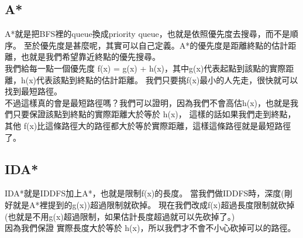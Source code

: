 \documentclass{article}
\begin{document}
\subsection{A*}
A*就是把BFS裡的queue換成priority queue，也就是依照優先度去搜尋，而不是順序。
至於優先度是甚麼呢，其實可以自己定義。A*的優先度是距離終點的估計距離，也就是我們希望靠近終點的優先搜尋。\\
我們給每一點一個優先度 f(x) = g(x) + h(x)，其中g(x)代表起點到該點的實際距離，h(x)代表該點到終點的估計距離。
我們只要挑f(x)最小的人先走，很快就可以找到最短路徑。\\
不過這樣真的會是最短路徑嗎？我們可以證明，因為我們不會高估h(x)，也就是我們只要保證該點到終點的實際距離大於等於 h(x)，
這樣的話如果我們走到終點，其他 f(x)比這條路徑大的路徑都大於等於實際距離，這樣這條路徑就是最短路徑了。

\subsection{IDA*}
IDA*就是IDDFS加上A*，也就是限制f(x)的長度。
當我們做IDDFS時，深度(剛好就是A*裡提到的g(x))超過限制就砍掉。
現在我們改成f(x)超過長度限制就砍掉(也就是不用g(x)超過限制，如果估計長度超過就可以先砍掉了。)\\
因為我們保證 實際長度大於等於 h(x)，所以我們才不會不小心砍掉可以的路徑。



\end{document}
